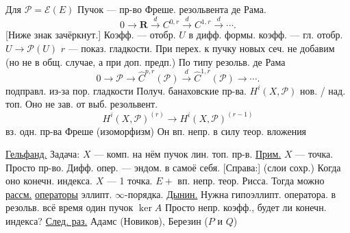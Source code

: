 Для $\mathcal P=\mathcal E(E)$ Пучок --- пр-во Фреше.
резольвента де Рама.
\begin{equation*}
0\longrightarrow\mathbf R\overset d{\longrightarrow}C^{0,r}
\overset d{\longrightarrow}C^{1,r}\overset d{\longrightarrow}\cdots.
\end{equation*}
[Ниже знак зачёркнут.]
Коэфф. --- отобр. $U$ в дифф. формы.
коэфф. --- гл. отобр. $U\longrightarrow\mathcal P(U)$
$r$ --- показ. гладкости.
При перех. к пучку новых сеч. не добавим (но не в общ. случае, а при доп. предп.)
По типу резольв. де Рама
\begin{equation*}
0\longrightarrow\mathcal P\longrightarrow\widehat C^{p,r}(\mathcal P)
\overset d{\longrightarrow}\widehat C^{1,r}(\mathcal P)\longrightarrow\cdots.
\end{equation*}
подправл. из-за пор. гладкости
Получ. банаховские пр-ва.
$H^i(X,\mathcal P)$ нов. / над. топ.
Оно не зав. от выб. резольвент.
\begin{equation*}
H^i(X,\mathcal P)^{(r)}\longrightarrow H^i(X,\mathcal P)^{(r-1)}
\end{equation*}
вз. одн. пр-ва Фреше (изоморфизм)
Он вп. непр. в силу теор. вложения

\underline{Гельфанд.} Задача: $X$ --- комп. на нём пучок лин. топ. пр-в.
\underline{Прим.} $X$ --- точка. Просто пр-во.
Дифф. опер. --- эндом. в самоё себя.
[Справа:] (слои сохр.)
Когда оно конечн. индекса.
$X$ --- 1 точка. $E+$ вп. непр. теор. Рисса.
Тогда можно \underline{рассм.} \underline{операторы} эллипт. $\infty$-порядка.
\underline{Дынин.}
Нужна гипоэллипт. оператора. в резольв. всё время один пучок $\ker A$
Просто непр. коэфф., будет ли конечн. индекса?
\underline{След. раз.} Адамс (Новиков), Березин ($P$ и $Q$)



